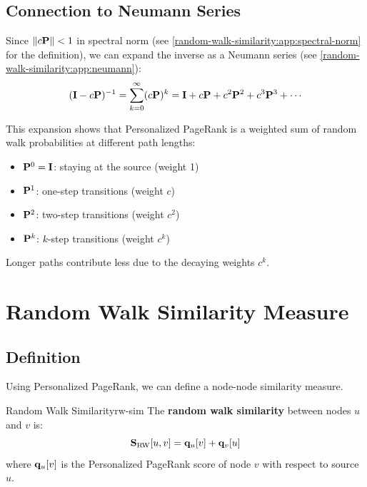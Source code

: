 \begin{notechapter}
\subsection{Connection to Neumann Series}

Since $\|c\mathbf{P}\| < 1$ in spectral norm (see \cref{random-walk-similarity:app:spectral-norm} for the definition), we can expand the inverse as a Neumann series (see \cref{random-walk-similarity:app:neumann}):
\begin{equation}
(\bI - c\bP)^{-1} = \sum_{k=0}^{\infty} (c\bP)^k = \bI + c\bP + c^2\bP^2 + c^3\bP^3 + \cdots
\label{random-walk-similarity:eq:neumann}
\end{equation}

\begin{intuition}
This expansion shows that Personalized PageRank is a weighted sum of random walk probabilities at different path lengths:
\begin{itemize}
    \item $\mathbf{P}^0 = \mathbf{I}$: staying at the source (weight 1)
    \item $\mathbf{P}^1$: one-step transitions (weight $c$)
    \item $\mathbf{P}^2$: two-step transitions (weight $c^2$)
    \item $\mathbf{P}^k$: $k$-step transitions (weight $c^k$)
\end{itemize}
Longer paths contribute less due to the decaying weights $c^k$.
\end{intuition}

\section{Random Walk Similarity Measure}

\subsection{Definition}

Using Personalized PageRank, we can define a node-node similarity measure.

\begin{definition}{Random Walk Similarity}{rw-sim}
The \textbf{random walk similarity} between nodes $u$ and $v$ is:
\begin{equation}
\mathbf{S}_{\text{RW}}[u, v] = \mathbf{q}_u[v] + \mathbf{q}_v[u]
\label{random-walk-similarity:eq:rw-sim}
\end{equation}
where $\mathbf{q}_u[v]$ is the Personalized PageRank score of node $v$ with respect to source $u$.
\end{definition}


\end{notechapter}
